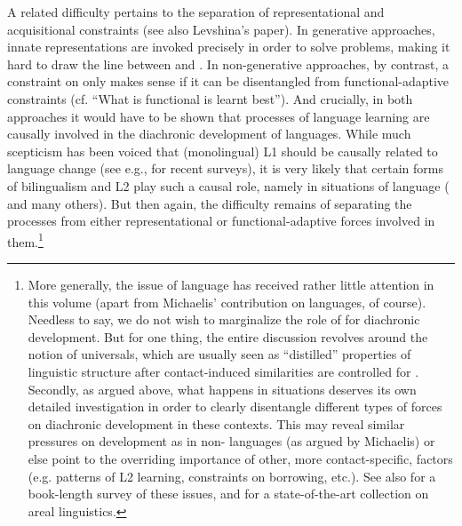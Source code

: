 \documentclass[output=paper]{langsci/langscibook}
\begin{document}
A related difficulty pertains to the separation of representational and acquisitional constraints (see also Levshina’s paper). In generative approaches, innate representations are invoked precisely in order to solve  problems, making it hard to draw the line between  and . In non-generative approaches, by contrast, a constraint on  only makes sense if it can be disentangled from functional-adaptive constraints (cf. “What is functional is learnt best”). And crucially, in both approaches it would have to be shown that processes of language learning are causally involved in the diachronic development of languages. While much scepticism has been voiced that (monolingual) L1  should be causally related to language change (see e.g., \citealt{Croft2000,HeineKuteva2007,Diessel2011_Acq} for recent surveys), it is very likely that certain forms of bilingualism and L2  play such a causal role, namely in situations of language  (\citealt{Matras2009,MeiselEtAl2013,Gast2017} and many others). But then again, the difficulty remains of separating the  processes from either representational or functional-adaptive forces involved in them.\footnote{More generally, the issue of language  has received rather little attention in this volume (apart from Michaelis’ contribution on  languages, of course). Needless to say, we do not wish to marginalize the role of  for diachronic development. But for one thing, the entire discussion revolves around the notion of universals, which are usually seen as “distilled” properties of linguistic structure after contact-induced similarities are controlled for \citep{Bickel2011_Modelling}. Secondly, as argued above, what happens in  situations deserves its own detailed investigation in order to clearly disentangle different types of forces on diachronic development in these contexts. This may reveal similar pressures on development as in non- languages (as argued by Michaelis) or else point to the overriding importance of other, more contact-specific, factors (e.g. patterns of L2 learning, constraints on borrowing, etc.). See also \citet{Matras2009} for a book-length survey of these issues, and \citet{Hickey2017} for a state-of-the-art collection on areal linguistics.}
\end{document}

